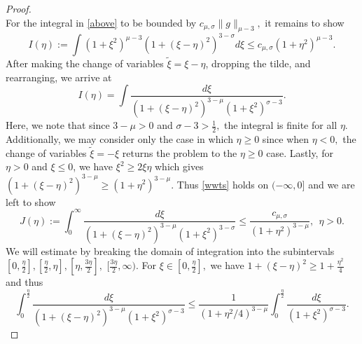 \documentclass[10pt,a4paper]{amsart}
\begin{document}
\begin{proof}
\begin{equation}
\end{equation}
For the integral in \eqref{above} to be bounded by $c_{\mu,\sigma}\|g\|_{\mu-3},$ it remains to show
\begin{equation}\label{wwts}
    I(\eta) := \int(1 + \xi^2)^{\mu-3}(1+(\xi - \eta)^2)^{3-\sigma}                 d\xi 
            \leq c_{\mu,\sigma}(1+\eta^2)^{\mu-3}.
\end{equation}
After making the change of variables $\tilde{\xi} = \xi - \eta$, dropping the tilde, and rearranging, we arrive at 
\begin{equation}
    I(\eta) = \int \frac{d \xi}{(1+(\xi - \eta)^2)^{3-\mu}(1 + \xi^2)^{\sigma-3}}.
\end{equation}
Here, we note that since $3 - \mu > 0$ and $\sigma - 3 > \frac12,$ the integral is finite for all $\eta.$ 
Additionally, we may consider only the case in which $\eta \geq 0$ since when $\eta < 0,$ the change of variables $\tilde{\xi} = -\xi$ returns the problem to the $\eta \geq 0$ case.  
Lastly, for $\eta >0 $ and $\xi \leq 0$, we have $\xi^2 \geq 2\xi\eta$ which gives $(1+(\xi - \eta)^2)^{3-\mu}\geq(1 + \eta^2)^{3-\mu}$. 
Thus \eqref{wwts} holds on $(-\infty, 0]$ and we are left to show 
\begin{equation}
    J(\eta) := \int_0^{\infty}\frac{d \xi}{(1+(\xi - \eta)^2)^{3-\mu}(1 + \xi^2)^{3-\sigma}} \leq \frac{c_{\mu,\sigma}}{(1 + \eta^2)^{3-\mu}}, \ \ \eta>0.
\end{equation}
We will estimate by breaking the domain of integration into the subintervals 
    $[0, \frac\eta2], [\frac\eta2,\eta], [\eta,\frac{3\eta}{2}],$ $ [\frac{3\eta}{2},\infty)$. 
For $\xi \in [0,\frac\eta2 ],$ we have 
    $1 + (\xi - \eta)^2 \geq 1 + \frac{\eta^2}{4}$ and thus 
\begin{equation*}
    \int_0^{\frac{\eta}{2}}\frac{d \xi}{(1+(\xi - \eta)^2)^{3-\mu}(1 + \xi^2)^{\sigma-3}} 
        \leq \frac{1}{(1+\eta^2/4)^{3-\mu}}\int_0^{\frac{\eta}{2}}\frac{d \xi}{(1 + \xi^2)^{\sigma-3}}.
\end{equation*}

\end{proof}
\end{document}
